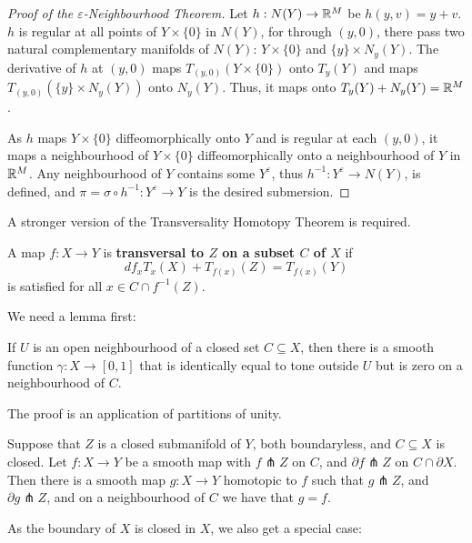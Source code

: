 \begin{proof}[Proof of the $\varepsilon$-Neighbourhood Theorem]
    Let $h: N(Y) \to \mathbb{R}^M$ be $h(y,v) = y + v$. $h$ is regular at all points of $Y \times \{0\}$ in $N(Y)$, for through $(y,0)$, there pass two natural complementary manifolds of $N(Y)$: $Y \times \{0\}$ and $\{y\} \times N_y(Y)$. The derivative of $h$ at $(y,0)$ maps $T_{(y,0)}(Y \times \{0\})$ onto $T_y(Y)$ and maps $T_{(y,0)}(\{y\} \times N_y(Y))$ onto $N_y(Y)$. Thus, it maps onto $T_y(Y) + N_y(Y) = \mathbb{R}^M$.

    As $h$ maps $Y \times \{0\}$ diffeomorphically onto $Y$ and is regular at each $(y,0)$, it maps a neighbourhood of $Y \times \{0\}$ diffeomorphically onto a neighbourhood of $Y$ in $\mathbb{R}^M$. Any neighbourhood of $Y$ contains some $Y^\varepsilon$, thus $h^{-1}: Y^\varepsilon \to N(Y)$, is defined, and $\pi = \sigma \circ h^{-1}: Y^\varepsilon \to Y$ is the desired submersion.
\end{proof}

A stronger version of the Transversality Homotopy Theorem is required. 

\begin{definition}
    A map $f: X \to Y$ is \textbf{transversal to $Z$ on a subset $C$ of $X$} if 
    \[df_xT_x(X) + T_{f(x)}(Z) = T_{f(x)}(Y)\]
    is satisfied for all $x \in C \cap f^{-1}(Z)$. 
\end{definition}

We need a lemma first:

\begin{lemma}
    If $U$ is an open neighbourhood of a closed set $C \subseteq X$, then there is a smooth function $\gamma: X \to [0,1]$ that is identically equal to tone outside $U$ but is zero on a neighbourhood of $C$. 
\end{lemma}

The proof is an application of partitions of unity.

\begin{theorem}
    Suppose that $Z$ is a closed submanifold of $Y$, both boundaryless, and $C \subseteq X$ is closed. Let $f: X \to Y$ be a smooth map with $f \pitchfork Z$ on $C$, and $\partial f \pitchfork Z$ on $C \cap \partial X$. Then there is a smooth map $g: X \to Y$ homotopic to $f$ such that $g \pitchfork Z$, and $\partial g \pitchfork Z$, and on a neighbourhood of $C$ we have that $g = f$. 
\end{theorem}

As the boundary of $X$ is closed in $X$, we also get a special case:

